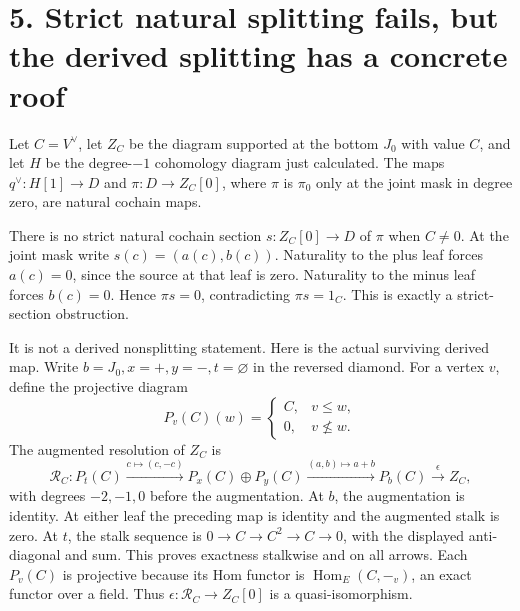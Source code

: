 \section{5. Strict natural splitting fails, but the derived splitting
has a concrete
roof}\label{proof03:strict-natural-splitting-fails-but-the-derived-splitting-has-a-concrete-roof}

Let \(C=V^\vee\), let \(Z_C\) be the diagram supported at the bottom
\(J_0\) with value \(C\), and let \(H\) be the degree-\(-1\) cohomology
diagram just calculated. The maps \(q^\vee:H[1]\to D\) and
\(\pi:D\to Z_C[0]\), where \(\pi\) is \(\pi_0\) only at the joint mask
in degree zero, are natural cochain maps.

There is no strict natural cochain section \(s:Z_C[0]\to D\) of \(\pi\)
when \(C\ne0\). At the joint mask write \(s(c)=(a(c),b(c))\). Naturality
to the plus leaf forces \(a(c)=0\), since the source at that leaf is
zero. Naturality to the minus leaf forces \(b(c)=0\). Hence \(\pi s=0\),
contradicting \(\pi s=1_C\). This is exactly a strict-section
obstruction.

It is not a derived nonsplitting statement. Here is the actual surviving
derived map. Write \(b=J_0,x=+,y=-,t=\varnothing\) in the reversed
diamond. For a vertex \(v\), define the projective diagram \[
P_v(C)(w)=\begin{cases}C,&v\le w,\\0,&v\nleq w.\end{cases}
\] The augmented resolution of \(Z_C\) is \[
\mathcal R_C:
P_t(C)\xrightarrow{c\mapsto(c,-c)}
P_x(C)\oplus P_y(C)\xrightarrow{(a,b)\mapsto a+b}
P_b(C)\xrightarrow{\epsilon}Z_C,
\] with degrees \(-2,-1,0\) before the augmentation. At \(b\), the
augmentation is identity. At either leaf the preceding map is identity
and the augmented stalk is zero. At \(t\), the stalk sequence is
\(0\to C\to C^2\to C\to0\), with the displayed anti-diagonal and sum.
This proves exactness stalkwise and on all arrows. Each \(P_v(C)\) is
projective because its Hom functor is \(\operatorname{Hom}_E(C,-_v)\),
an exact functor over a field. Thus \(\epsilon:\mathcal R_C\to Z_C[0]\)
is a quasi-isomorphism.

